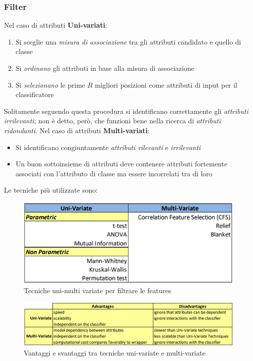 \subsubsection{Filter} 
Nel caso di attributi \textbf{Uni-variati}: 
\begin{enumerate}
	\item Si sceglie una \textit{misura di associazione} tra gli attributi candidato e quello di classe
	\item Si \textit{ordinano} gli attributi in base alla misura di associazione
	\item Si \textit{selezionano} le prime $R$ migliori posizioni come attributi di input per il classificatore
\end{enumerate}
Solitamente seguendo questa procedura si identificano correttamente gli \textit{attributi irrilevanti}; non è detto, però, che funzioni bene nella ricerca di \textit{attributi ridondanti}.
Nel caso di attributi \textbf{Multi-variati}:
\begin{itemize}
	\item Si identificano congiuntamente \textit{attributi rilevanti} e \textit{irrilevanti}
	\item Un buon sottoinsieme di attributi deve contenere attributi fortemente associati con l'attributo di classe ma essere incorrelati tra di loro
\end{itemize}
Le tecniche più utilizzate sono:
\begin{figure}[H]
	\centering
	\includegraphics[height=0.35 \linewidth]{classification/pict/feature_tecniques.png}
	\caption{Tecniche uni-multi variate per filtrare le features}
\end{figure}
\begin{figure}[H]
	\centering
	\includegraphics[width=\linewidth] {classification/pict/filter_uni_multi.png}
	\caption{Vantaggi e svantaggi tra tecniche uni-variate e multi-variate}
\end{figure}
